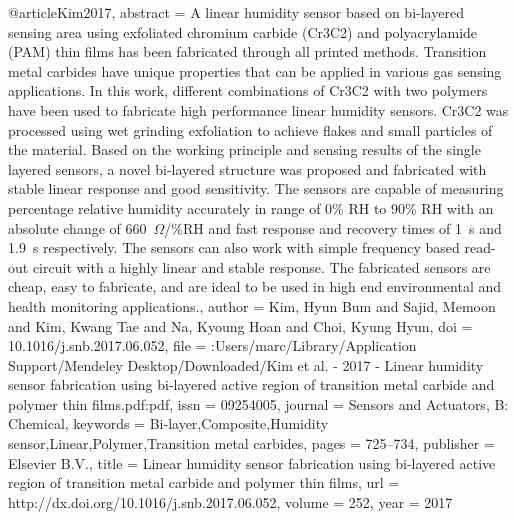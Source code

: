 @article{Kim2017,
abstract = {A linear humidity sensor based on bi-layered sensing area using exfoliated chromium carbide (Cr3C2) and polyacrylamide (PAM) thin films has been fabricated through all printed methods. Transition metal carbides have unique properties that can be applied in various gas sensing applications. In this work, different combinations of Cr3C2 with two polymers have been used to fabricate high performance linear humidity sensors. Cr3C2 was processed using wet grinding exfoliation to achieve flakes and small particles of the material. Based on the working principle and sensing results of the single layered sensors, a novel bi-layered structure was proposed and fabricated with stable linear response and good sensitivity. The sensors are capable of measuring percentage relative humidity accurately in range of 0{\%} RH to 90{\%} RH with an absolute change of 660 $\Omega$/{\%}RH and fast response and recovery times of 1 s and 1.9 s respectively. The sensors can also work with simple frequency based read-out circuit with a highly linear and stable response. The fabricated sensors are cheap, easy to fabricate, and are ideal to be used in high end environmental and health monitoring applications.},
author = {Kim, Hyun Bum and Sajid, Memoon and Kim, Kwang Tae and Na, Kyoung Hoan and Choi, Kyung Hyun},
doi = {10.1016/j.snb.2017.06.052},
file = {:Users/marc/Library/Application Support/Mendeley Desktop/Downloaded/Kim et al. - 2017 - Linear humidity sensor fabrication using bi-layered active region of transition metal carbide and polymer thin films.pdf:pdf},
issn = {09254005},
journal = {Sensors and Actuators, B: Chemical},
keywords = {Bi-layer,Composite,Humidity sensor,Linear,Polymer,Transition metal carbides},
pages = {725--734},
publisher = {Elsevier B.V.},
title = {{Linear humidity sensor fabrication using bi-layered active region of transition metal carbide and polymer thin films}},
url = {http://dx.doi.org/10.1016/j.snb.2017.06.052},
volume = {252},
year = {2017}
}
